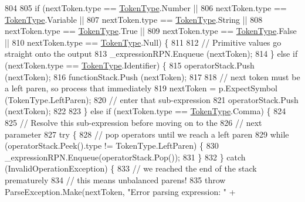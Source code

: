 \begin{DoxyCode}
804 
805                     \textcolor{keywordflow}{if} (nextToken.type == \hyperlink{a00045_a301aa7c866593a5b625a8fc158bbeace}{TokenType}.Number ||
806                         nextToken.type == \hyperlink{a00045_a301aa7c866593a5b625a8fc158bbeace}{TokenType}.Variable ||
807                         nextToken.type == \hyperlink{a00045_a301aa7c866593a5b625a8fc158bbeace}{TokenType}.String ||
808                         nextToken.type == \hyperlink{a00045_a301aa7c866593a5b625a8fc158bbeace}{TokenType}.True ||
809                         nextToken.type == \hyperlink{a00045_a301aa7c866593a5b625a8fc158bbeace}{TokenType}.False ||
810                         nextToken.type == \hyperlink{a00045_a301aa7c866593a5b625a8fc158bbeace}{TokenType}.Null) \{
811 
812                         \textcolor{comment}{// Primitive values go straight onto the output}
813                         \_expressionRPN.Enqueue (nextToken);
814                     \} \textcolor{keywordflow}{else} \textcolor{keywordflow}{if} (nextToken.type == \hyperlink{a00045_a301aa7c866593a5b625a8fc158bbeace}{TokenType}.Identifier) \{
815                         operatorStack.Push (nextToken);
816                         functionStack.Push (nextToken);
817 
818                         \textcolor{comment}{// next token must be a left paren, so process that immediately}
819                         nextToken = p.ExpectSymbol (TokenType.LeftParen);
820                         \textcolor{comment}{// enter that sub-expression}
821                         operatorStack.Push (nextToken);
822 
823                     \} \textcolor{keywordflow}{else} \textcolor{keywordflow}{if} (nextToken.type == \hyperlink{a00045_a301aa7c866593a5b625a8fc158bbeace}{TokenType}.Comma) \{
824 
825                         \textcolor{comment}{// Resolve this sub-expression before moving on to the}
826                         \textcolor{comment}{// next parameter}
827                         \textcolor{keywordflow}{try} \{
828                             \textcolor{comment}{// pop operators until we reach a left paren}
829                             \textcolor{keywordflow}{while} (operatorStack.Peek().type != TokenType.LeftParen) \{
830                                 \_expressionRPN.Enqueue(operatorStack.Pop());
831                             \}
832                         \} \textcolor{keywordflow}{catch} (InvalidOperationException) \{
833                             \textcolor{comment}{// we reached the end of the stack prematurely}
834                             \textcolor{comment}{// this means unbalanced parens!}
835                             \textcolor{keywordflow}{throw} ParseException.Make(nextToken, \textcolor{stringliteral}{"Error parsing expression: "} +

\end{DoxyCode}
